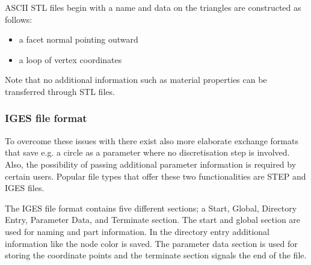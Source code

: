ASCII STL files begin with a name and data on the triangles are constructed as follows: 
\begin{itemize}
\item a facet normal pointing outward
\item a loop of vertex coordinates
\end{itemize}
Note that no additional information such as material properties can be transferred through STL files. 
\subsubsection{IGES file format}
To overcome these issues with there exist also more elaborate exchange formats that save e.g. a circle as a parameter where no discretisation step is involved. Also, the possibility of passing additional parameter information is required by certain users. Popular file types that offer these two functionalities are STEP and IGES files. 

The IGES file format contains five different sections; a Start, Global, Directory Entry, Parameter Data, and Terminate section. The start and global section are used for naming and part information. In the directory entry additional information like the node color is saved. The parameter data section is used for storing the coordinate points and the terminate section signals the end of the file. 
